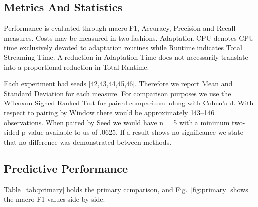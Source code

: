 \documentclass[conference]{IEEEtran}
\begin{document}
\subsection{Metrics And Statistics} 
Performance is evaluated through macro-F1, Accuracy, Precision and Recall measures. Costs may be measured in two fashions. Adaptation CPU denotes CPU time exclusively devoted to adaptation routines while Runtime indicates Total Streaming Time. A reduction in Adaptation Time does not necessarily translate into a proportional reduction in Total Runtime.


Each experiment had seeds [42,43,44,45,46]. Therefore we report Mean and Standard Deviation for each measure. For comparison purposes we use the Wilcoxon Signed-Ranked Test for paired comparisons along with Cohen’s d. With respect to pairing by Window there would be approximately 143–146 observations. When paired by Seed we would have n = 5 with a minimum two-sided p-value available to us of .0625. If a result shows no significance we state that no difference was demonstrated between methods.


\subsection{Predictive Performance}
Table~\ref{tab:primary} holds the primary comparison, and Fig.~\ref{fig:primary} shows
the macro-F1 values side by side.
\end{document}
